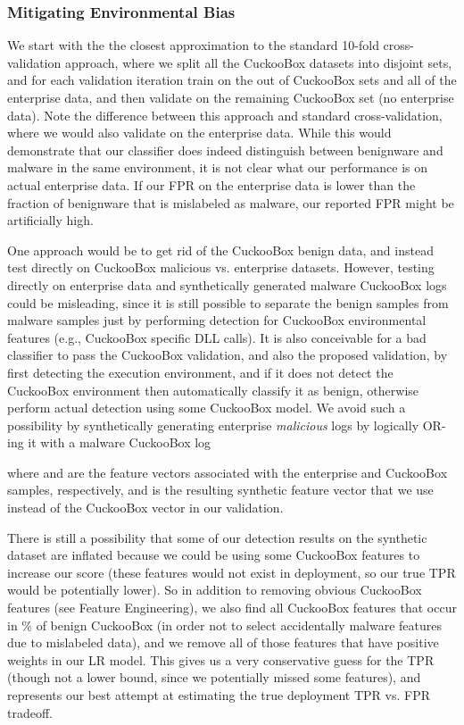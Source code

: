 \documentclass{sig-alternate-2013}
\newcommand{\eg}{e.g.\xspace}
\begin{document}
\subsubsection{Mitigating Environmental Bias}

We start with the the closest approximation to the standard 10-fold cross-validation approach, where we split all the CuckooBox datasets into  disjoint sets, and for each validation iteration train on the  out of  CuckooBox sets and all of the enterprise data, and then validate on the remaining CuckooBox set (no enterprise data). Note the difference between this approach and standard cross-validation, where we would also validate on the enterprise data. While this would demonstrate that our classifier does indeed distinguish between benignware and malware in the same environment, it is not clear what our performance is on actual enterprise data. If our FPR on the enterprise data is lower than the fraction of benignware that is mislabeled as malware, our reported FPR might be artificially high. 

One approach would be to get rid of the CuckooBox benign data, and instead test directly on CuckooBox malicious vs. enterprise datasets. However, testing directly on enterprise data and synthetically generated malware CuckooBox logs could be misleading, since it is still possible to separate the benign samples from malware samples just by performing detection for CuckooBox environmental features (\eg, CuckooBox specific DLL calls). It is also conceivable for a bad classifier to pass the CuckooBox validation, and also the proposed validation, by first detecting the execution environment, and if it does not detect the CuckooBox environment then automatically classify it as benign, otherwise perform actual detection using some CuckooBox model. We avoid such a possibility by synthetically generating enterprise {\it malicious} logs by logically OR-ing it with a malware CuckooBox log

where  and  are the feature vectors associated with the enterprise and CuckooBox samples, respectively, and  is the resulting synthetic feature vector that we use instead of the CuckooBox  vector in our validation. 

There is still a possibility that some of our detection results on the synthetic dataset are inflated because we could be using some CuckooBox features to increase our score (these features would not exist in deployment, so our true TPR would be potentially lower). So in addition to removing obvious CuckooBox features (see Feature Engineering), we also find all CuckooBox features that occur in \% of benign CuckooBox (in order not to select accidentally malware features due to mislabeled data), and we remove all of those features that have positive weights in our LR model. This gives us a very conservative guess for the TPR (though not a lower bound, since we potentially missed some features), and represents our best attempt at estimating the true deployment TPR vs. FPR tradeoff.
\end{document}
